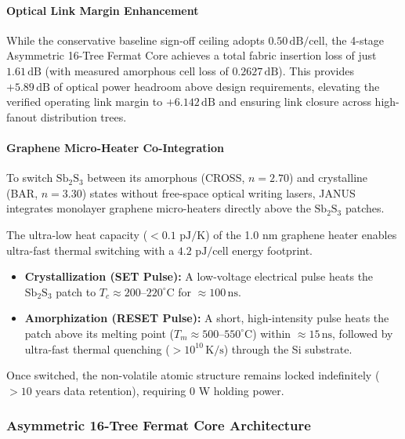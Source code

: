 \documentclass[journal]{IEEEtran}
\begin{document}
\paragraph{\textbf{Optical Link Margin Enhancement}}
While the conservative baseline sign-off ceiling adopts $0.50\,\mathrm{dB/cell}$, the 4-stage Asymmetric 16-Tree Fermat Core achieves a total fabric insertion loss of just $1.61\,\mathrm{dB}$ (with measured amorphous cell loss of $0.2627\,\mathrm{dB}$). This provides $+5.89\,\mathrm{dB}$ of optical power headroom above design requirements, elevating the verified operating link margin to $\mathbf{+6.142\,\mathrm{dB}}$ and ensuring link closure across high-fanout distribution trees.

\paragraph{\textbf{Graphene Micro-Heater Co-Integration}}
To switch $\mathrm{Sb_2S_3}$ between its amorphous (CROSS, $n=2.70$) and crystalline (BAR, $n=3.30$) states without free-space optical writing lasers, JANUS integrates monolayer graphene micro-heaters directly above the $\mathrm{Sb_2S_3}$ patches.

The ultra-low heat capacity ($< 0.1\text{ pJ/K}$) of the 1.0 nm graphene heater enables ultra-fast thermal switching with a $4.2\text{ pJ/cell}$ energy footprint. 

\begin{itemize}
\item \textbf{Crystallization (SET Pulse):} A low-voltage electrical pulse heats the $\mathrm{Sb_2S_3}$ patch to $T_c \approx 200\text{--}220^\circ\mathrm{C}$ for $\approx 100\,\mathrm{ns}$.
\item \textbf{Amorphization (RESET Pulse):} A short, high-intensity pulse heats the patch above its melting point ($T_m \approx 500\text{--}550^\circ\mathrm{C}$) within $\approx 15\,\mathrm{ns}$, followed by ultra-fast thermal quenching ($> 10^{10}\,\mathrm{K/s}$) through the Si substrate.
\end{itemize}

Once switched, the non-volatile atomic structure remains locked indefinitely ($> 10\text{ years}$ data retention), requiring 0 W holding power.

\subsubsection{\textbf{Asymmetric 16-Tree Fermat Core Architecture}}
\label{sec:16tree_arch}
\end{document}
